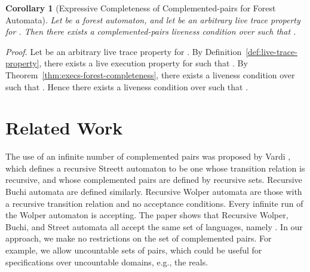\documentclass[11pt]{article}
\newcommand{\bco}{\begin{corollary}}
\newcommand{\eco}{\end{corollary}}
\newcommand{\bpr}{\begin{proof}}
\newcommand{\epr}{\end{proof}}
\newtheorem{corollary}[theorem]{Corollary}
\newenvironment{proof}{\vspace{-1.0ex}\textit{Proof.} }
                      {\hfill{}}
\begin{document}
\bco[Expressive Completeness of Complemented-pairs for Forest Automata]
\label{thm:traces-forest-completeness}
Let  be a forest automaton, and let  be an arbitrary
live trace property for . Then there exists a complemented-pairs liveness condition
 over  such that .
\eco
\bpr
Let  be an arbitrary live trace property for .
By Definition~\ref{def:live-trace-property}, 
there exists a live execution property  for  such that 
.
By Theorem~\ref{thm:execs-forest-completeness}, there exists a liveness condition
 over  such that .
Hence there exists a liveness condition
 over  such that .
\epr



\section{Related Work}
\label{sec:related}

The use of an infinite number of complemented pairs was proposed by
Vardi \cite{Var91}, which defines a recursive Streett automaton to be
one whose transition relation is recursive, and whose complemented
pairs are defined by recursive sets. Recursive Buchi automata are
defined similarly. Recursive Wolper automata are those with a
recursive transition relation and no acceptance conditions. Every
infinite run of the Wolper automaton is accepting.
The paper shows that Recursive Wolper, Buchi, and Street
automata all accept the same set of languages, namely .
In our approach, we make no restrictions on the set of complemented
pairs. For example, we allow uncountable sets of pairs, which could be
useful for specifications over uncountable domains, e.g., the reals.
\end{document}
